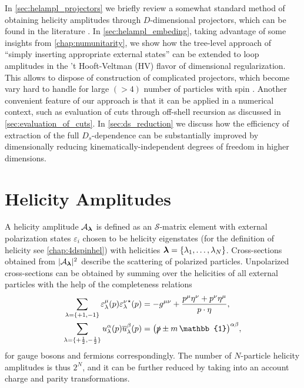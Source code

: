 In \cref{sec:helampl_projectors} we briefly review a somewhat standard 
method of obtaining helicity amplitudes through $D$-dimensional projectors,
which can be found in the literature \cite{Garland:2002ak, Moch:2002hm, Glover:2003cm, Glover:2004si,Gehrmann:2009vu,Gehrmann:2011aa}. 
In \cref{sec:helampl_embeding}, 
taking advantage of some insights from \cref{chap:numunitarity},
we show how the tree-level approach of ``simply inserting appropriate external states'' can
be extended to loop amplitudes in the 't Hooft-Veltman (HV) flavor of dimensional regularization.
This allows to dispose of construction of complicated projectors, which
become vary hard to handle for large $(> 4)$ number of particles with spin \cite{Peraro:2019cjj}. 
Another convenient feature of our approach is that it can be applied in a numerical context, such
as evaluation of cuts through off-shell recursion as discussed in \cref{sec:evaluation_of_cuts}.
In \cref{sec:ds_reduction} we discuss how
the efficiency of extraction of the full $D_s$-dependence can be substantially improved
by dimensionally reducing kinematically-independent degrees of freedom in higher dimensions.



\section{Helicity Amplitudes}
\label{sec:HV_helicity_amplitudes}

A helicity amplitude $\mathcal{A}_{\vb*{\lambda}}$
is defined as an $\mathcal{S}$-matrix element
with external polarization states $\varepsilon_{i}$ chosen to be
helicity eigenstates (for the definition of helicity see \cref{chap:4dspinhel}) with helicities $\vb*{\lambda}=\{\lambda_1,\ldots{},\lambda_N\}$.
Cross-sections obtained from $\vert \mathcal{A}_{\vb*{\lambda}}{} \vert^2$ describe
the scattering of polarized particles.
Unpolarized cross-sections can be obtained by summing over the helicities of all external particles
with the help of the completeness relations
\begin{subequations}
  \label{eq:4d_completeness_relations}
  \begin{align}
    \sum_{\lambda=\{+1,-1\}} \varepsilon^\mu_\lambda(p){\varepsilon^\nu_\lambda}^{\star{}}(p)  &= -g^{\mu\nu} + \frac{p^\mu \eta^\nu + p^\nu \eta^\mu}{\sp(p,\eta)}, \\
    \sum_{\lambda=\{+\frac{1}{2},-\frac{1}{2}\}} u^\alpha_\lambda(p){\overline{u}_\lambda^\beta}(p)  &= \qty(\slashed{p}  \pm m\,\mathbb{1})^{\alpha\beta},
  \end{align}
\end{subequations}
for gauge bosons and fermions correspondingly.
The number of $N$-particle helicity amplitudes is thus $2^N$, and
it can be further reduced by taking into an account charge and parity transformations.

